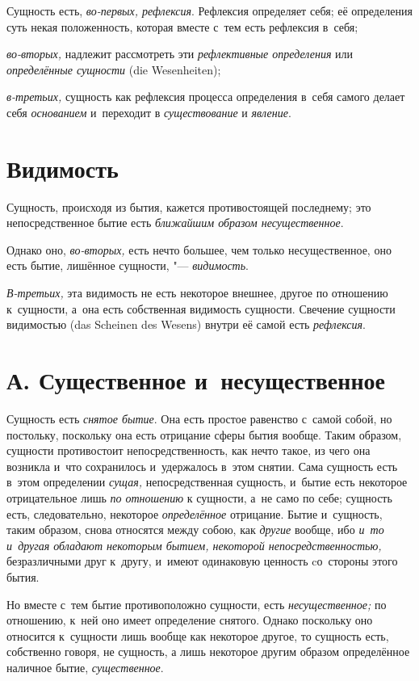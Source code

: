 Сущность есть, {\em во-первых, рефлексия}. Рефлексия определяет себя;
её определения суть некая положенность, которая вместе с~тем есть
рефлексия в~себя;

{\em во-вторых,} надлежит рассмотреть эти {\em рефлективные определения} или
{\em определённые сущности} (die Wesenheiten);

{\em в-третьих,} сущность как рефлексия процесса
определения в~себя самого делает себя {\em основанием}
и~переходит в {\em существование} и {\em явление}.

\section{Видимость}

Сущность, происходя из бытия, кажется
противостоящей последнему; это непосредственное бытие есть
{\em ближайшим образом несущественное}.

Однако оно, {\em во-вторых,} есть нечто большее, чем только
несущественное, оно есть бытие, лишённое сущности, "--- {\em видимость}.

{\em В-третьих,} эта видимость не есть некоторое
внешнее, другое по отношению к~сущности, а~она есть собственная видимость
сущности. Свечение сущности видимостью (das Scheinen des Wesens) внутри её
самой есть {\em рефлексия}.

\section[А. Существенное и~несущественное]{А. Существенное и~несущественное}

Сущность есть {\em снятое бытие}.
Она есть простое равенство с~самой собой, но постольку, поскольку
она есть отрицание сферы бытия вообще. Таким образом, сущности противостоит
непосредственность, как нечто такое, из чего она возникла и~что сохранилось
и~удержалось в~этом снятии. Сама сущность есть в~этом определении
{\em сущая,} непосредственная сущность, и~бытие есть
некоторое отрицательное лишь {\em по отношению} к
сущности, а~не само по себе; сущность есть, следовательно, некоторое
{\em определённое} отрицание. Бытие и~сущность, таким
образом, снова относятся между собою, как {\em другие} вообще, ибо
{\em и~то и~другая обладают некоторым бытием, некоторой непосредственностью,}
безразличными друг к~другу, и~имеют одинаковую ценность cо~стороны этого бытия.

Но вместе с~тем бытие противоположно сущности, есть
{\em несущественное;} по отношению, к~ней оно имеет
определение снятого. Однако поскольку оно относится к~сущности лишь вообще
как некоторое другое, то сущность есть, собственно говоря, не сущность, а
лишь некоторое другим образом определённое наличное бытие,
{\em существенное}.

